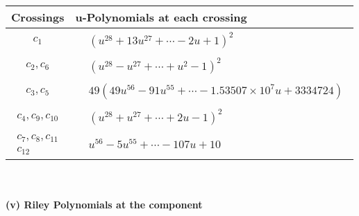 \documentclass[1p]{elsarticle_modified}
\theoremstyle{definition}
\begin{document}
\begin{tabular}{m{50pt}|m{274pt}}
Crossings & \hspace{64pt}u-Polynomials at each crossing \\
\hline $$\begin{aligned}c_{1}\end{aligned}$$&$\begin{aligned}
&(u^{28}+13 u^{27}+\cdots-2 u+1)^{2}
\end{aligned}$\\
\hline $$\begin{aligned}c_{2},c_{6}\end{aligned}$$&$\begin{aligned}
&(u^{28}- u^{27}+\cdots+u^2-1)^{2}
\end{aligned}$\\
\hline $$\begin{aligned}c_{3},c_{5}\end{aligned}$$&$\begin{aligned}
&49(49 u^{56}-91 u^{55}+\cdots-1.53507\times10^{7} u+3334724)
\end{aligned}$\\
\hline $$\begin{aligned}c_{4},c_{9},c_{10}\end{aligned}$$&$\begin{aligned}
&(u^{28}+u^{27}+\cdots+2 u-1)^{2}
\end{aligned}$\\
\hline $$\begin{aligned}c_{7},c_{8},c_{11}\\c_{12}\end{aligned}$$&$\begin{aligned}
&u^{56}-5 u^{55}+\cdots-107 u+10
\end{aligned}$\\
\hline
\end{tabular}\\~\\
\newpage\renewcommand{\arraystretch}{1}
\flushleft \textbf{(v) Riley Polynomials at the component}\newline \\
\end{document}
